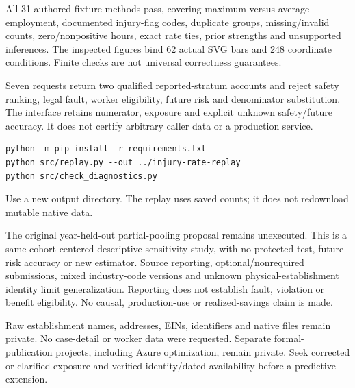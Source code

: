 \documentclass[11pt,letterpaper]{article}
\newcommand{\heading}[1]{\vspace{4pt}{\large\bfseries #1}\par}
\newcommand{\BoundCH}{31}
\newcommand{\BoundCI}{62}
\newcommand{\BoundCJ}{248}
\begin{document}
All \BoundCH{} authored fixture methods pass, covering maximum versus average employment, documented injury-flag codes, duplicate groups, missing/invalid counts, zero/nonpositive hours, exact rate ties, prior strengths and unsupported inferences. The inspected figures bind \BoundCI{} actual SVG bars and \BoundCJ{} coordinate conditions. Finite checks are not universal correctness guarantees.

\heading{Runnable implementation exercise}
Seven requests return two qualified reported-stratum accounts and reject safety ranking, legal fault, worker eligibility, future risk and denominator substitution. The interface retains numerator, exposure and explicit unknown safety/future accuracy. It does not certify arbitrary caller data or a production service.
\begin{verbatim}
python -m pip install -r requirements.txt
python src/replay.py --out ../injury-rate-replay
python src/check_diagnostics.py
\end{verbatim}
Use a new output directory. The replay uses saved counts; it does not redownload mutable native data.

\heading{Material limits and next evidence}
The original year-held-out partial-pooling proposal remains unexecuted. This is a same-cohort-centered descriptive sensitivity study, with no protected test, future-risk accuracy or new estimator. Source reporting, optional/nonrequired submissions, mixed industry-code versions and unknown physical-establishment identity limit generalization. Reporting does not establish fault, violation or benefit eligibility. No causal, production-use or realized-savings claim is made.

Raw establishment names, addresses, EINs, identifiers and native files remain private. No case-detail or worker data were requested. Separate formal-publication projects, including Azure optimization, remain private. Seek corrected or clarified exposure and verified identity/dated availability before a predictive extension.
\end{document}
